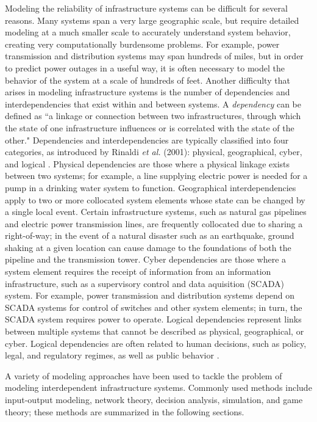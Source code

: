 Modeling the reliability of infrastructure systems can be difficult for several reasons.  Many systems span a very large geographic scale, but require detailed modeling at a much smaller scale to accurately understand system behavior, creating very computationally burdensome problems.  For example, power transmission and distribution systems may span hundreds of miles, but in order to predict power outages in a useful way, it is often necessary to model the behavior of the system at a scale of hundreds of feet.  Another difficulty that arises in modeling infrastructure systems is the number of dependencies and interdependencies that exist within and between systems.  A \emph{dependency} can be defined as ``a linkage or connection between two infrastructures, through which the state of one infrastructure influences or is correlated with the state of the other\cite{Rinaldi2001}."   Dependencies and interdependencies are typically classified into four categories, as introduced by Rinaldi \emph{et al.} (2001): physical, geographical, cyber, and logical \cite{Rinaldi2001}.  Physical dependencies are those where a physical linkage exists between two systems; for example, a line supplying electric power is needed for a pump in a drinking water system to function.  Geographical interdependencies apply to two or more collocated system elements whose state can be changed by a single local event.  Certain infrastructure systems, such as natural gas pipelines and electric power transmission lines, are frequently collocated due to sharing a right-of-way; in the event of a natural disaster such as an earthquake, ground shaking at a given location can cause damage to the foundations of both the pipeline and the transmission tower.  Cyber dependencies are those where a system element requires the receipt of information from an information infrastructure, such as a supervisory control and data aquisition (SCADA) system. For example, power transmission and distribution systems depend on SCADA systems for control of switches and other system elements; in turn, the SCADA system requires power to operate.  Logical dependencies represent links between multiple systems that cannot be described as physical, geographical, or cyber.  Logical dependencies are often related to human decisions, such as policy, legal, and regulatory regimes, as well as public behavior \cite{Rinaldi2001,Rinaldi2004}.

A variety of modeling approaches have been used to tackle the problem of modeling interdependent infrastructure systems.  Commonly used methods include input-output modeling, network theory, decision analysis, simulation, and game theory; these methods are summarized in the following sections.

